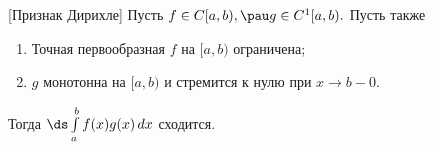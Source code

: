 [Признак Дирихле]
	Пусть $f\in C[a,b),\pau g\in C^1[a,b).$ Пусть также
	\begin{enumerate}
	  \item Точная первообразная $f$ на $[a,b)$ ограничена;
	  \item $g$ монотонна на $[a,b)$ и стремится к нулю при $x\to b-0$.
	\end{enumerate}
	Тогда $\ds\int\limits_a^bf(x)g(x)\,dx$ сходится.
	